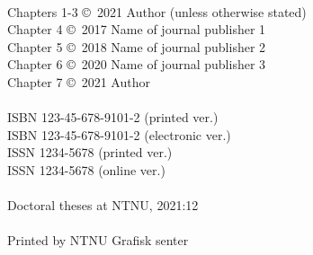 { \vspace{3.0mm} \\
\noindent Chapters 1-3 \copyright \ 2021 Author (unless otherwise stated) \\
Chapter 4 \copyright \ 2017 Name of journal publisher 1 \\
Chapter 5 \copyright \ 2018 Name of journal publisher 2 \\
Chapter 6 \copyright \ 2020 Name of journal publisher 3 \\
Chapter 7 \copyright \ 2021 Author \\
\\ 
ISBN {123-45-678-9101-2} (printed ver.) \\
ISBN {123-45-678-9101-2} (electronic ver.) \\
ISSN {1234-5678} (printed ver.) \\
ISSN {1234-5678} (online ver.) \\
\\
Doctoral theses at NTNU, 2021:12 \\
\\
Printed by NTNU Grafisk senter
}